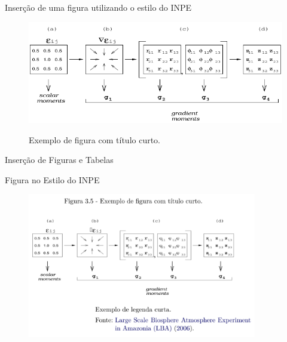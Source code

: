 \documentclass[10pt]{beamer}
\begin{document}
\begingroup
{}
\begin{frame}{}
  \begin{meucomandolf}{Inserção de uma figura utilizando o estilo do INPE}
    \begin{figure}[H]
      \caption{Exemplo de figura com título curto.}
      \vspace{6mm} %
      \begin{center}
        \includegraphics[width=12cm]{./figs/gpa.pdf}  
      \end{center}
      \vspace{4mm} %
      \label{figgpa1}
    \end{figure}
    \end{meucomandolf}
\end{frame}
\endgroup

\begin{frame}{Inserção de Figuras e Tabelas}
    \begin{block}{Figura no Estilo do INPE}
        \begin{figure}[H]
          \begin{center}
            \includegraphics[width=10cm]{./figs/exefigestiinpe.pdf}  
          \end{center}
        \end{figure}
    \end{block}
\end{frame}
\end{document}

